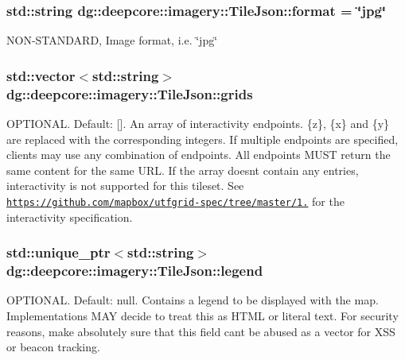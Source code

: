 \subsubsection[{\texorpdfstring{format}{format}}]{\setlength{\rightskip}{0pt plus 5cm}std\+::string dg\+::deepcore\+::imagery\+::\+Tile\+Json\+::format = \char`\"{}jpg\char`\"{}}\hypertarget{structdg_1_1deepcore_1_1imagery_1_1_tile_json_a0ac858ae62a9b9243e8bd8c31a86af7b}{}\label{structdg_1_1deepcore_1_1imagery_1_1_tile_json_a0ac858ae62a9b9243e8bd8c31a86af7b}
N\+O\+N-\/\+S\+T\+A\+N\+D\+A\+RD, Image format, i.\+e. \char`\"{}jpg\char`\"{} 
\subsubsection[{\texorpdfstring{grids}{grids}}]{\setlength{\rightskip}{0pt plus 5cm}std\+::vector$<$std\+::string$>$ dg\+::deepcore\+::imagery\+::\+Tile\+Json\+::grids}\hypertarget{structdg_1_1deepcore_1_1imagery_1_1_tile_json_a0155f9490e2a1db7894307c860bb5f93}{}\label{structdg_1_1deepcore_1_1imagery_1_1_tile_json_a0155f9490e2a1db7894307c860bb5f93}
O\+P\+T\+I\+O\+N\+AL. Default\+: \mbox{[}\mbox{]}. An array of interactivity endpoints. \{z\}, \{x\} and \{y\} are replaced with the corresponding integers. If multiple endpoints are specified, clients may use any combination of endpoints. All endpoints M\+U\+ST return the same content for the same U\+RL. If the array doesn\textquotesingle{}t contain any entries, interactivity is not supported for this tileset. See \href{https://github.com/mapbox/utfgrid-spec/tree/master/1.2}{\tt https\+://github.\+com/mapbox/utfgrid-\/spec/tree/master/1.} for the interactivity specification. 
\subsubsection[{\texorpdfstring{legend}{legend}}]{\setlength{\rightskip}{0pt plus 5cm}std\+::unique\+\_\+ptr$<$std\+::string$>$ dg\+::deepcore\+::imagery\+::\+Tile\+Json\+::legend}\hypertarget{structdg_1_1deepcore_1_1imagery_1_1_tile_json_a6c3f9e95dcca896f30244d71b4a93be1}{}\label{structdg_1_1deepcore_1_1imagery_1_1_tile_json_a6c3f9e95dcca896f30244d71b4a93be1}
O\+P\+T\+I\+O\+N\+AL. Default\+: null. Contains a legend to be displayed with the map. Implementations M\+AY decide to treat this as H\+T\+ML or literal text. For security reasons, make absolutely sure that this field can\textquotesingle{}t be abused as a vector for X\+SS or beacon tracking. 
